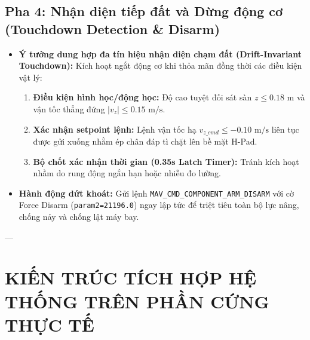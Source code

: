\documentclass[12pt,a4paper]{article}
\begin{document}
\subsection{Pha 4: Nhận diện tiếp đất và Dừng động cơ (Touchdown Detection \& Disarm)}
\begin{itemize}[noitemsep,topsep=2pt]
    \item \textbf{Ý tưởng dung hợp đa tín hiệu nhận diện chạm đất (Drift-Invariant Touchdown):}
    Kích hoạt ngắt động cơ khi thỏa mãn đồng thời các điều kiện vật lý:
    \begin{enumerate}[noitemsep]
        \item \textbf{Điều kiện hình học/động học:} Độ cao tuyệt đối sát sàn $z \le 0.18\text{ m}$ và vận tốc thẳng đứng $|v_z| \le 0.15\text{ m/s}$.
        \item \textbf{Xác nhận setpoint lệnh:} Lệnh vận tốc hạ $v_{z\_cmd} \le -0.10\text{ m/s}$ liên tục được gửi xuống nhằm ép chân đáp tì chặt lên bề mặt H-Pad.
        \item \textbf{Bộ chốt xác nhận thời gian (0.35s Latch Timer):} Tránh kích hoạt nhầm do rung động ngắn hạn hoặc nhiễu đo lường.
    \end{enumerate}
    \item \textbf{Hành động dứt khoát:} Gửi lệnh \texttt{MAV\_CMD\_COMPONENT\_ARM\_DISARM} với cờ Force Disarm (\texttt{param2=21196.0}) ngay lập tức để triệt tiêu toàn bộ lực nâng, chống nảy và chống lật máy bay.
\end{itemize}

---

\section{KIẾN TRÚC TÍCH HỢP HỆ THỐNG TRÊN PHẦN CỨNG THỰC TẾ}
\end{document}
